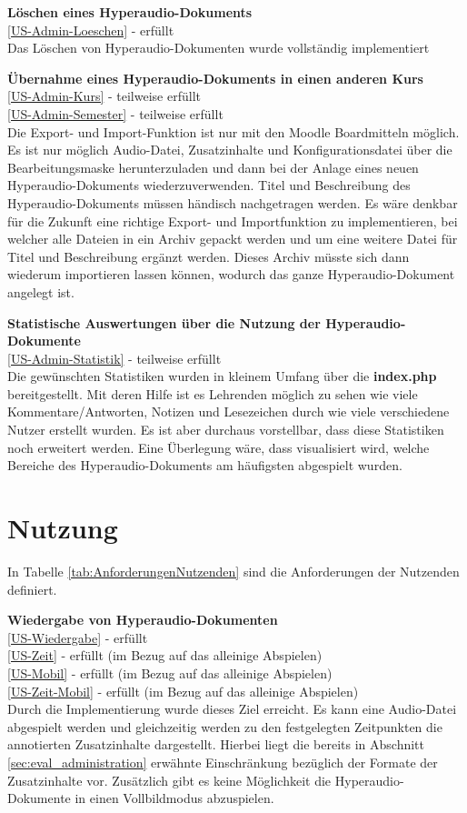 \textbf{Löschen eines Hyperaudio-Dokuments}\\
\ref{US-Admin-Loeschen} - erfüllt\\
Das Löschen von Hyperaudio-Dokumenten wurde vollständig implementiert

\textbf{Übernahme eines Hyperaudio-Dokuments in einen anderen Kurs}\\
\ref{US-Admin-Kurs} - teilweise erfüllt\\
\ref{US-Admin-Semester} - teilweise erfüllt\\
Die Export- und Import-Funktion ist nur mit den Moodle Boardmitteln möglich. Es ist nur möglich Audio-Datei, Zusatzinhalte und Konfigurationsdatei über die Bearbeitungsmaske herunterzuladen und dann bei der Anlage eines neuen Hyperaudio-Dokuments wiederzuverwenden. Titel und Beschreibung des Hyperaudio-Dokuments müssen händisch nachgetragen werden. Es wäre denkbar für die Zukunft eine richtige Export- und Importfunktion zu implementieren, bei welcher alle Dateien in ein Archiv gepackt werden und um eine weitere Datei für Titel und Beschreibung ergänzt werden. Dieses Archiv müsste sich dann wiederum importieren lassen können, wodurch das ganze Hyperaudio-Dokument angelegt ist.

\textbf{Statistische Auswertungen über die Nutzung der Hyperaudio-Dokumente}\\
\ref{US-Admin-Statistik} - teilweise erfüllt\\
Die gewünschten Statistiken wurden in kleinem Umfang über die \textbf{index.php} bereitgestellt. Mit deren Hilfe ist es Lehrenden möglich zu sehen wie viele Kommentare/Antworten, Notizen und Lesezeichen durch wie viele verschiedene Nutzer erstellt wurden. Es ist aber durchaus vorstellbar, dass diese Statistiken noch erweitert werden. Eine Überlegung wäre, dass visualisiert wird, welche Bereiche des Hyperaudio-Dokuments am häufigsten abgespielt wurden.

 
\section{Nutzung}
In Tabelle \ref{tab:AnforderungenNutzenden} sind die Anforderungen der Nutzenden definiert.

\textbf{Wiedergabe von Hyperaudio-Dokumenten}\\
\ref{US-Wiedergabe} - erfüllt\\
\ref{US-Zeit} - erfüllt (im Bezug auf das alleinige Abspielen)\\
\ref{US-Mobil} - erfüllt (im Bezug auf das alleinige Abspielen)\\
\ref{US-Zeit-Mobil} - erfüllt (im Bezug auf das alleinige Abspielen)\\
Durch die Implementierung wurde dieses Ziel erreicht. Es kann eine Audio-Datei abgespielt werden und gleichzeitig werden zu den festgelegten Zeitpunkten die annotierten Zusatzinhalte dargestellt. Hierbei liegt die bereits in Abschnitt \ref{sec:eval_administration} erwähnte Einschränkung bezüglich der Formate der Zusatzinhalte vor. Zusätzlich gibt es keine Möglichkeit die Hyperaudio-Dokumente in einen Vollbildmodus abzuspielen.


